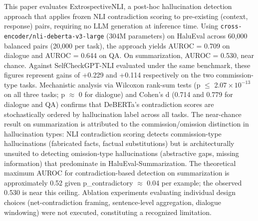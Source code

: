 
This paper evaluates ExtrospectiveNLI, a post-hoc hallucination detection approach that applies frozen NLI contradiction scoring to pre-existing (context, response) pairs, requiring no LLM generation at inference time. Using \texttt{cross-encoder/nli-deberta-v3-large} (304M parameters) on HaluEval across 60,000 balanced pairs (20,000 per task), the approach yields AUROC = 0.709 on dialogue and AUROC = 0.644 on QA. On summarization, AUROC = 0.530, near chance. Against SelfCheckGPT-NLI evaluated under the same benchmark, these figures represent gains of +0.229 and +0.114 respectively on the two commission-type tasks. Mechanistic analysis via Wilcoxon rank-sum tests (p $\leq$ 2.$07\times 10^{-13}$ on all three tasks; p $\approx$ 0 for dialogue) and Cohen's d (0.714 and 0.779 for dialogue and QA) confirms that DeBERTa's contradiction scores are stochastically ordered by hallucination label across all tasks. The near-chance result on summarization is attributed to the commission/omission distinction in hallucination types: NLI contradiction scoring detects commission-type hallucinations (fabricated facts, factual substitutions) but is architecturally unsuited to detecting omission-type hallucinations (abstractive gaps, missing information) that predominate in HaluEval-Summarization. The theoretical maximum AUROC for contradiction-based detection on summarization is approximately 0.52 given p\_contradictory $\approx$ 0.04 per example; the observed 0.530 is near this ceiling. Ablation experiments evaluating individual design choices (net-contradiction framing, sentence-level aggregation, dialogue windowing) were not executed, constituting a recognized limitation.
